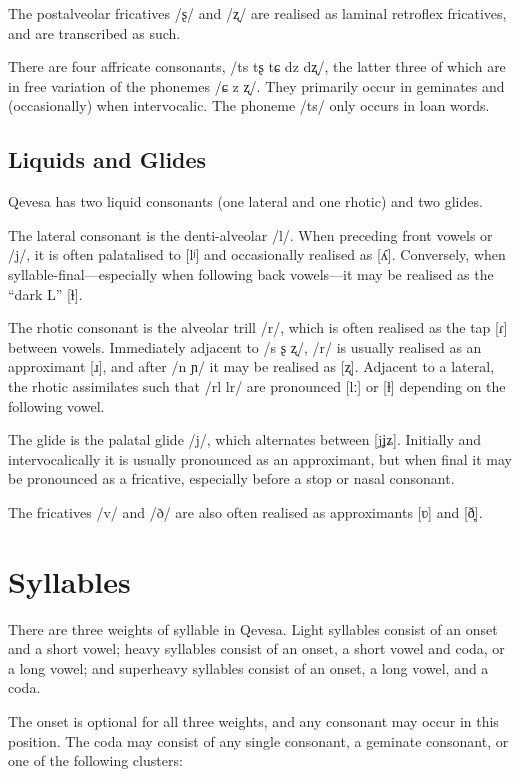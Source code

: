 \documentclass[grammar]{subfiles}
\begin{document}
The postalveolar fricatives /ʂ/ and /ʐ/ are realised as laminal retroflex
fricatives, and are transcribed as such.

There are four affricate consonants, /ts tʂ tɕ dz dʐ/, the latter three of which
are in free variation of the phonemes /ɕ z ʐ/.  They primarily occur in
geminates and (occasionally) when intervocalic.  The phoneme /ts/ only occurs
in loan words.


\subsection{Liquids and Glides}
\label{ssec:liquids}

Qevesa has two liquid consonants (one lateral and one rhotic) and two glides.

The lateral consonant is the denti-alveolar /l/.  When preceding front vowels
or /j/, it is often palatalised to [lʲ] and occasionally realised as [ʎ].
Conversely, when syllable-final—especially when following back vowels—it may be
realised as the “dark L” [ɫ].

The rhotic consonant is the alveolar trill /r/, which is often realised as the
tap [ɾ] between vowels.  Immediately adjacent to /s ʂ ʐ/, /r/ is usually
realised as an approximant [ɹ], and after /n ɲ/ it may be realised as [ʐ].
Adjacent to a lateral, the rhotic assimilates such that /rl lr/ are pronounced
[lː] or [ɫ] depending on the following vowel.

The glide is the palatal glide /j/, which alternates between [j\tlde ʝ\tlde ʑ].
Initially and intervocalically it is usually pronounced as an approximant, but
when final it may be pronounced as a fricative, especially before a stop or
nasal consonant.  

The fricatives /v/ and /ð/ are also often realised as approximants [ʋ] and [ð̞].  


\section{Syllables}
\label{sec:syllables}

There are three weights of syllable in Qevesa.  Light syllables consist of an
onset and a short vowel; heavy syllables consist of an onset, a short vowel and
coda, or a long vowel; and superheavy syllables consist of an onset, a long
vowel, and a coda. 

The onset is optional for all three weights, and any consonant may occur in
this position.  The coda may consist of any single consonant, a geminate
consonant, or one of the following clusters:
\end{document}
